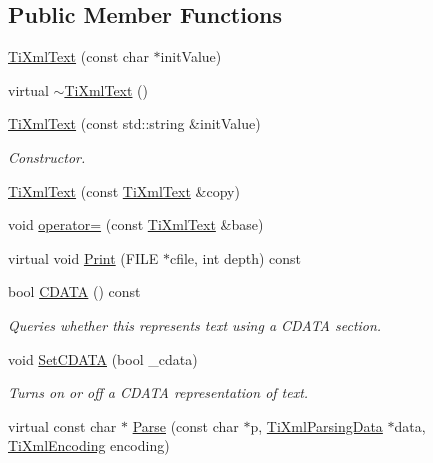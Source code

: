 \subsection*{Public Member Functions}
\begin{DoxyCompactItemize}
\item 
\hyperlink{class_ti_xml_text_af659e77c6b87d684827f35a8f4895960}{Ti\-Xml\-Text} (const char $\ast$init\-Value)
\item 
virtual \hyperlink{class_ti_xml_text_a829a4bd2d8d2461c333eb4f3f5b1b3d2}{$\sim$\-Ti\-Xml\-Text} ()
\item 
\hyperlink{class_ti_xml_text_a439792f6183a3d3fb6f2bc2b16fa5691}{Ti\-Xml\-Text} (const std\-::string \&init\-Value)
\begin{DoxyCompactList}\small\item\em Constructor. \end{DoxyCompactList}\item 
\hyperlink{class_ti_xml_text_a8d2cc1b4af2208cbb0171cf20f6815d1}{Ti\-Xml\-Text} (const \hyperlink{class_ti_xml_text}{Ti\-Xml\-Text} \&copy)
\item 
void \hyperlink{class_ti_xml_text_af5f15d40d048cea7cab9d0eb4fd8a7d2}{operator=} (const \hyperlink{class_ti_xml_text}{Ti\-Xml\-Text} \&base)
\item 
virtual void \hyperlink{class_ti_xml_text_ae74d56c5b3ddec6cc3103dd51821af92}{Print} (F\-I\-L\-E $\ast$cfile, int depth) const 
\item 
bool \hyperlink{class_ti_xml_text_ad1a6a6b83fa2271022dd97c072a2b586}{C\-D\-A\-T\-A} () const 
\begin{DoxyCompactList}\small\item\em Queries whether this represents text using a C\-D\-A\-T\-A section. \end{DoxyCompactList}\item 
void \hyperlink{class_ti_xml_text_acb17ff7c5d09b2c839393445a3de5ea9}{Set\-C\-D\-A\-T\-A} (bool \-\_\-cdata)
\begin{DoxyCompactList}\small\item\em Turns on or off a C\-D\-A\-T\-A representation of text. \end{DoxyCompactList}\item 
virtual const char $\ast$ \hyperlink{class_ti_xml_text_a8d2dcfa41fc73d3e62dacc2fcf633819}{Parse} (const char $\ast$p, \hyperlink{class_ti_xml_parsing_data}{Ti\-Xml\-Parsing\-Data} $\ast$data, \hyperlink{tinyxml_8h_a88d51847a13ee0f4b4d320d03d2c4d96}{Ti\-Xml\-Encoding} encoding)
\item 

\end{DoxyCompactItemize}
